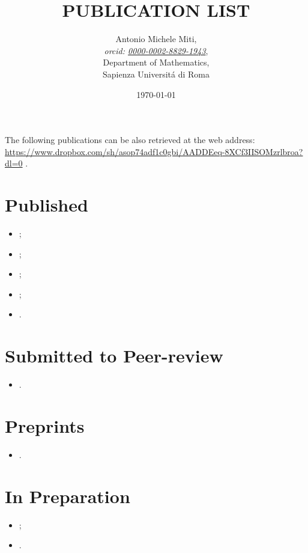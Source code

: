 \documentclass{article}
\title{PUBLICATION LIST}
\date{\today}
\author{
	Antonio Michele Miti,\\
	\emph{orcid: \href{https://orcid.org/0000-0002-8829-1943}{0000-0002-8829-1943}},
	\\
	Department of Mathematics,\\
	Sapienza Universit\'a di Roma
}
\begin{document}
  

	\maketitle

	\noindent
  The following publications can be also retrieved at the web address:
  \\ 
  \url{https://www.dropbox.com/sh/asop74adf1c0gbi/AADDEeq-8XCf3IISOMzrlbroa?dl=0}
  .


  \section*{Published}
	  \begin{itemize}
	   \item {};		
 	   \item {};
 	   \item {};
 	   \item {};
 	   \item {}.
	  \end{itemize}



  \section*{Submitted to Peer-review}
	  \begin{itemize}
 	   \item {}.
	  \end{itemize}

  \section*{Preprints}
	  \begin{itemize}
    	   \item {}.
	  \end{itemize}
  
  \section*{In Preparation}
	  \begin{itemize}
    	\item {};
    	\item {}.
	  \end{itemize}

  
\end{document}
